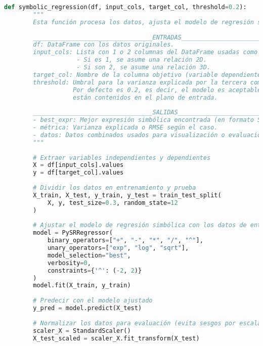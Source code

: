 \documentclass[11pt, a4paper]{article} %
\begin{document}
\begin{lstlisting}[language=Python, caption=Implementación del modelo de regresión simbólica, basicstyle=\tiny,label={code:1}]
    def symbolic_regression(df, input_cols, target_col, threshold=0.2):
        """
        Esta función procesa los datos, ajusta el modelo de regresión simbólica (SR) y cuantifica su ajuste.
    
        _________________________________ENTRADAS________________________________
        df: DataFrame con los datos originales.
        input_cols: Lista con 1 o 2 columnas del DataFrame usadas como variables independientes.
                    - Si es 1, se asume una relación 2D.
                    - Si son 2, se asume una relación 3D.
        target_col: Nombre de la columna objetivo (variable dependiente).
        threshold: Umbral para la varianza explicada por la tercera componente (en caso 3D).
                   Por defecto es 0.2, es decir, el modelo es aceptable si el 80% de los datos
                   están contenidos en el plano de entrada.
    
        _________________________________SALIDAS________________________________
        - best_expr: Mejor expresión simbólica encontrada (en formato SymPy) si cumple el umbral.
        - métrica: Varianza explicada o RMSE según el caso.
        - datos: Datos combinados usados para visualización o evaluación.
        """
    
        # Extraer variables independientes y dependientes
        X = df[input_cols].values
        y = df[target_col].values
    
        # Dividir los datos en entrenamiento y prueba
        X_train, X_test, y_train, y_test = train_test_split(
            X, y, test_size=0.3, random_state=12
        )
    
        # Ajustar el modelo de regresión simbólica con los datos de entrenamiento
        model = PySRRegressor(
            binary_operators=["+", "-", "*", "/", "^"],
            unary_operators=["exp", "log", "sqrt"],
            model_selection="best",
            verbosity=0,
            constraints={'^': (-2, 2)}
        )
        model.fit(X_train, y_train)
    
        # Predecir con el modelo ajustado
        y_pred = model.predict(X_test)
    
        # Normalizar los datos para evaluación (evita sesgos por escalas)
        scaler_X = StandardScaler()
        X_test_scaled = scaler_X.fit_transform(X_test)
    

\end{lstlisting}
\end{document}
